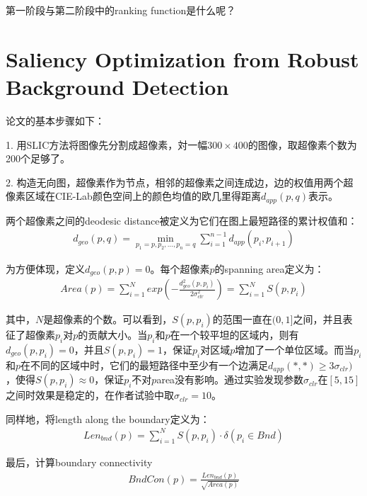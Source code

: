 \documentclass[12pt]{article}
\begin{document}
第一阶段与第二阶段中的ranking function是什么呢？

\section{Saliency Optimization from Robust Background Detection}

论文的基本步骤如下：

1. 用SLIC方法将图像先分割成超像素，対一幅$300 \times 400$的图像，取超像素个数为200个足够了。

2. 构造无向图，超像素作为节点，相邻的超像素之间连成边，边的权值用两个超像素区域在CIE-Lab颜色空间上的颜色均值的欧几里得距离$d_{app}(p, q)$表示。

两个超像素之间的deodesic distance被定义为它们在图上最短路径的累计权值和：
\begin{align}
d_{geo}(p, q) = \min_{p_1=p, p_2, \ldots, p_n=q}\sum_{i=1}^{n-1}d_{app}(p_i, p_{i+1})
\end{align}

为方便体现，定义$d_{geo}(p, p) = 0$。每个超像素$p$的spanning area定义为：
\begin{align}
Area(p) = \sum_{i=1}^N exp(-\frac{d_{geo}^2(p, p_i)}{2\sigma_{clr}^2})=\sum_{i=1}^N S(p, p_i)
\end{align}

其中，$N$是超像素的个数。可以看到，$S(p, p_i)$的范围一直在$(0, 1]$之间，并且表征了超像素$p_i$对$p$的贡献大小。当$p_i$和$p$在一个较平坦的区域内，则有$d_{geo}(p, p_i) = 0$，并且$S(p, p_i) =1$，保证$p_i$对区域$p$增加了一个单位区域。而当$p_i$和$p$在不同的区域中时，它们的最短路径中至少有一个边满足$d_{app}(*, *)\ge 3\sigma_{clr})$，使得$S(p, p_i)\approx0$，保证$p_i$不对$p$area没有影响。通过实验发现参数$\sigma_{clr}$在$[5,15]$之间时效果是稳定的，在作者试验中取$\sigma_{clr}=10$。

同样地，将length along the boundary定义为：
\begin{align}
Len_{bnd}(p) = \sum_{i=1}^N S(p, p_i) \cdot \delta(p_i \in Bnd)
\end{align}

最后，计算boundary connectivity
\begin{align}
BndCon(p) = \frac{Len_{bnd}(p)}{\sqrt{Area(p)}}
\end{align}


%


\end{document}
